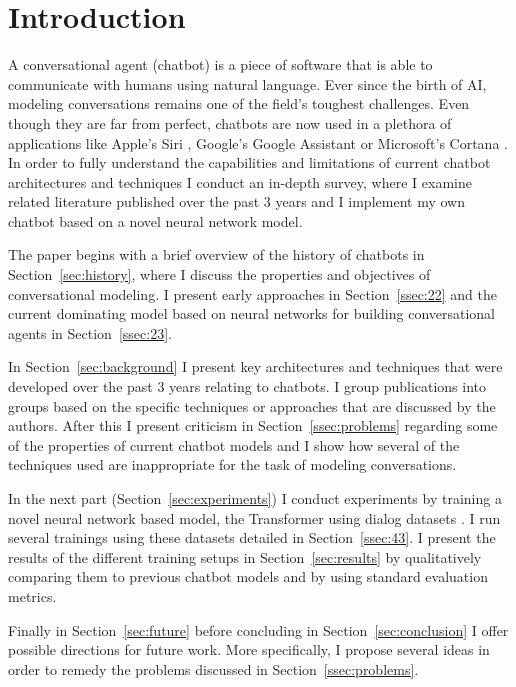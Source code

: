 \documentclass[12pt]{article}
\begin{document}
\newpage\tableofcontents
\newpage\section{Introduction} \label{sec:intro}

A conversational agent (chatbot) is a piece of software that is able to communicate with humans using natural language. Ever since the birth of AI, modeling conversations remains one of the field's toughest challenges. Even though they are far from perfect, chatbots are now used in a plethora of applications like Apple's Siri \cite{Siri:2017}, Google's Google Assistant \cite{Google:2017} or Microsoft's Cortana \cite{Cortana:2017}. In order to fully understand the capabilities and limitations of current chatbot architectures and techniques I conduct an in-depth survey, where I examine related literature published over the past 3 years and I implement my own chatbot based on a novel neural network model. 

The paper begins with a brief overview of the history of chatbots in Section~\ref{sec:history}, where I discuss the properties and objectives of conversational modeling. I present early approaches in Section~\ref{ssec:22} and the current dominating model based on neural networks for building conversational agents in Section~\ref{ssec:23}.

In Section~\ref{sec:background} I present key architectures and techniques that were developed over the past 3 years relating to chatbots. I group publications into groups based on the specific techniques or approaches that are discussed by the authors. After this I present criticism in Section~\ref{ssec:problems} regarding some of the properties of current chatbot models and I show how several of the techniques used are inappropriate for the task of modeling conversations.

In the next part (Section~\ref{sec:experiments}) I conduct experiments by training a novel neural network based model, the Transformer \cite{Vaswani:2017} using dialog datasets \cite{Danescu:2011,Tiedemann:2009,OpenSubtitles:2016}. I run several trainings using these datasets detailed in Section~\ref{ssec:43}. I present the results of the different training setups in Section~\ref{sec:results} by qualitatively comparing them to previous chatbot models and by using standard evaluation metrics.

Finally in Section~\ref{sec:future} before concluding in Section~\ref{sec:conclusion} I offer possible directions for future work. More specifically, I propose several ideas in order to remedy the problems discussed in Section~\ref{ssec:problems}.
\end{document}
